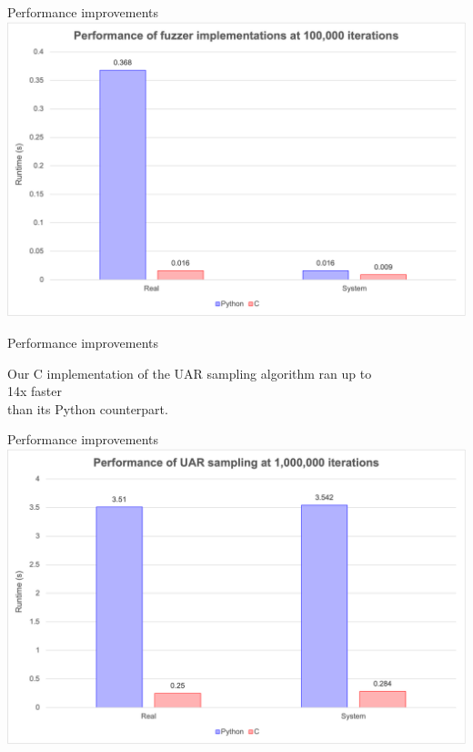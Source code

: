 \documentclass{beamer}
\begin{document}
\begin{frame}{Performance improvements}
	\centering
	\includegraphics[height=0.85\textheight]{img/fuzzergraph.png}
\end{frame}

\begin{frame}{Performance improvements}

	\begin{center}
		Our C implementation of the UAR sampling algorithm ran up to\\
		\vspace{10pt} %
		{\Huge %
		14x faster} \\ %
		\vspace{10pt} %
		than its Python counterpart.	
	\end{center}
	
\end{frame}

\begin{frame}{Performance improvements}
	\centering
	\includegraphics[height=0.85\textheight]{img/uargraph.png}
\end{frame}
\end{document}
